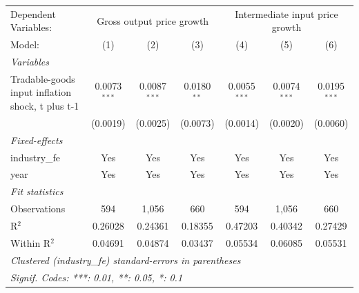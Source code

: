 \begingroup
\centering
\begin{tabular}{lcccccc}
   \tabularnewline \midrule \midrule
   Dependent Variables: & \multicolumn{3}{c}{Gross output price growth} & \multicolumn{3}{c}{Intermediate input price growth}\\
   Model:                                           & (1)            & (2)            & (3)           & (4)            & (5)            & (6)\\  
   \midrule
   \emph{Variables}\\
   Tradable-goods input inflation shock, t plus t-1 & 0.0073$^{***}$ & 0.0087$^{***}$ & 0.0180$^{**}$ & 0.0055$^{***}$ & 0.0074$^{***}$ & 0.0195$^{***}$\\   
                                                    & (0.0019)       & (0.0025)       & (0.0073)      & (0.0014)       & (0.0020)       & (0.0060)\\   
   \midrule
   \emph{Fixed-effects}\\
   industry\_fe                                     & Yes            & Yes            & Yes           & Yes            & Yes            & Yes\\  
   year                                             & Yes            & Yes            & Yes           & Yes            & Yes            & Yes\\  
   \midrule
   \emph{Fit statistics}\\
   Observations                                     & 594            & 1,056          & 660           & 594            & 1,056          & 660\\  
   R$^2$                                            & 0.26028        & 0.24361        & 0.18355       & 0.47203        & 0.40342        & 0.27429\\  
   Within R$^2$                                     & 0.04691        & 0.04874        & 0.03437       & 0.05534        & 0.06085        & 0.05531\\  
   \midrule \midrule
   \multicolumn{7}{l}{\emph{Clustered (industry\_fe) standard-errors in parentheses}}\\
   \multicolumn{7}{l}{\emph{Signif. Codes: ***: 0.01, **: 0.05, *: 0.1}}\\
\end{tabular}
\par\endgroup
